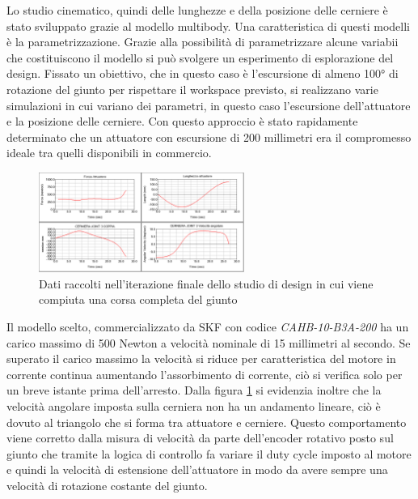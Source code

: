 \documentclass[%
corpo=11pt,
twoside,
 stile=classica,
oldstyle,
greek,%
]{toptesi}
\begin{document}
	Lo studio cinematico, quindi delle lunghezze e della posizione delle cerniere è stato sviluppato grazie al modello multibody. Una caratteristica di questi modelli è la parametrizzazione. Grazie alla possibilità di parametrizzare alcune variabii che costituiscono il modello si può svolgere un esperimento di esplorazione del design. 
	Fissato un obiettivo, che in questo caso è l'escursione di almeno 100° di rotazione del giunto per rispettare il workspace previsto, si realizzano varie simulazioni in cui variano dei parametri, in questo caso l'escursione dell'attuatore e la posizione delle cerniere. 
	Con questo approccio è stato rapidamente determinato che un attuatore con escursione di 200 millimetri era il compromesso ideale tra quelli disponibili in commercio. 
	\begin{figure}
		\centering
		\includegraphics[width=0.6\textwidth]{Plots/GOMITO/Joint3.png}
		\caption{Dati raccolti nell'iterazione finale dello studio di design in cui viene compiuta una corsa completa del giunto }
		\label{fig:MBDLinear}
	\end{figure}
	Il modello scelto, commercializzato da SKF con codice \textit{CAHB-10-B3A-200} ha un carico massimo di 500 Newton a velocità nominale di 15 millimetri al secondo. Se superato il carico massimo la velocità si riduce per caratteristica del motore in corrente continua aumentando l'assorbimento di corrente, ciò si verifica solo per un breve istante prima dell'arresto. Dalla figura \ref{fig:MBDLinear} si evidenzia inoltre che la velocità angolare imposta sulla cerniera non ha un andamento lineare, ciò è dovuto al triangolo che si forma tra attuatore e cerniere. Questo comportamento viene corretto dalla misura di velocità da parte dell'encoder rotativo posto sul giunto che tramite la logica di controllo fa variare il duty cycle imposto al motore e quindi la velocità di estensione dell'attuatore in modo da avere sempre una velocità di rotazione costante del giunto. 
	
	
	
	
		
\end{document}
